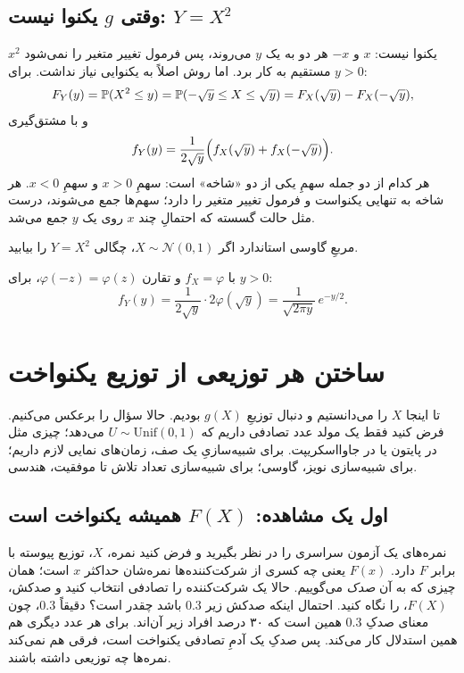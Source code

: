 \subsection{وقتی $g$ یکنوا نیست: $Y=X^2$}
\label{sec:nonmono}

$x^2$ یکنوا نیست: $x$ و $-x$ هر دو به یک $y$ می‌روند، پس فرمول تغییر متغیر را نمی‌شود مستقیم به کار برد. اما روش  اصلاً به یکنوایی نیاز نداشت. برای $y>0$:
\[ F_Y(y)=\P(X^2\le y)=\P(-\sqrt y\le X\le\sqrt y)=F_X(\sqrt y)-F_X(-\sqrt y), \]
و با مشتق‌گیری
\[ f_Y(y)=\frac{1}{2\sqrt y}\Bigl(f_X(\sqrt y)+f_X(-\sqrt y)\Bigr). \]
هر کدام از دو جمله سهمِ یکی از دو «شاخه» است: سهمِ $x>0$ و سهمِ $x<0$. هر شاخه به تنهایی یکنواست و فرمول تغییر متغیر را دارد؛ سهم‌ها جمع می‌شوند، درست مثل حالت گسسته که احتمالِ چند $x$ روی یک $y$ جمع می‌شد.

\begin{example}[label=ex:chi2]{مربعِ گاوسی استاندارد}
اگر $X\sim\mathcal N(0,1)$، چگالی $Y=X^2$ را بیابید.
\begin{solution}
با $f_X=\varphi$ و تقارن $\varphi(-z)=\varphi(z)$، برای $y>0$:
\[ f_Y(y)=\frac{1}{2\sqrt y}\cdot2\varphi(\sqrt y)=\frac{1}{\sqrt{2\pi y}}\,e^{-y/2}. \]
\end{solution}
\end{example}

\section{ساختن هر توزیعی از توزیع یکنواخت}
\label{sec:inverse}

تا اینجا $X$ را می‌دانستیم و دنبال توزیعِ $g(X)$ بودیم. حالا سؤال را برعکس می‌کنیم. فرض کنید فقط یک مولد عدد تصادفی داریم که $U\sim\mathrm{Unif}(0,1)$ می‌دهد؛ چیزی مثل  در پایتون یا  در جاوااسکریپت. برای شبیه‌سازیِ یک صف، زمان‌های نمایی لازم داریم؛ برای شبیه‌سازی نویز، گاوسی؛ برای شبیه‌سازی تعداد تلاش تا موفقیت، هندسی. 

\subsection{اول یک مشاهده: $F(X)$ همیشه یکنواخت است}

نمره‌های یک آزمون سراسری را در نظر بگیرید و فرض کنید نمره، $X$، توزیع پیوسته با  برابر $F$ دارد. $F(x)$ یعنی چه کسری از شرکت‌کننده‌ها نمره‌شان حداکثر $x$ است؛ همان چیزی که به آن \emph{صدک} می‌گوییم. حالا یک شرکت‌کننده را تصادفی انتخاب کنید و صدکش، $F(X)$، را نگاه کنید. احتمال اینکه صدکش زیر $0.3$ باشد چقدر است؟ دقیقاً $0.3$، چون معنای صدکِ $0.3$ همین است که ۳۰ درصد افراد زیر آن‌اند. برای هر عدد دیگری هم همین استدلال کار می‌کند. پس صدکِ یک آدمِ تصادفی یکنواخت است، فرقی هم نمی‌کند نمره‌ها چه توزیعی داشته باشند.

